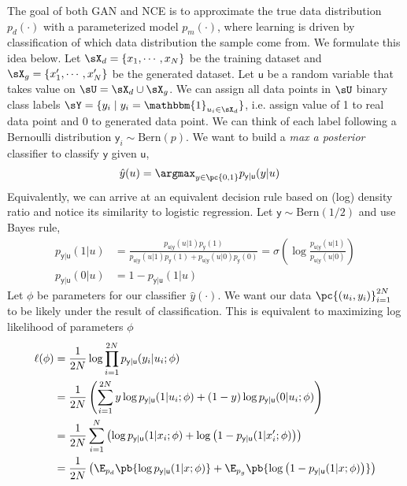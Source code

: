 \documentclass[11pt]{article}
\newcommand\ry{\ensuremath{\mathsf{y}}}
\newcommand\ru{\ensuremath{\mathsf{u}}}
\begin{document}
The goal of both GAN and NCE is to approximate the true data distribution $p_d(\cdot)$ with a parameterized model $p_m(\cdot)$, where learning is driven by classification of which data distribution the sample come from. We formulate this idea below. Let $\sX_d = \{x_1,\cdots,x_N\}$ be the training dataset and $\sX_g = \{x_1',\cdots,x_N'\}$ be the generated dataset. Let $\ru$ be a random variable that takes value on $\sU = \sX_d\cup \sX_g$. We can assign all data points in $\sU$ binary class labels $\sY = \{y_i \mid y_i = \mathbbm{1}_{u_i\in \sX_d} \}$, i.e. assign value of 1 to real data point and 0 to generated data point. We can think of each label following a Bernoulli distribution $\ry_i\sim\text{Bern}(p)$. We want to build a \textit{max a posterior} classifier to classify $\ry$ given $\ru$,
\begin{align*}
    \hat{y}(u) 
        &= \argmax_{y\in\pc{0,1}} p_{\ry|\ru}(y|u)
\end{align*}
Equivalently, we can arrive at an equivalent decision rule based on (log) density ratio and notice its similarity to logistic regression. Let $\ry\sim\text{Bern}(1/2)$ and use Bayes rule,
\begin{align*}
    p_{\ry|\ru}(1|u)
        &= \frac{ p_{\ru|\ry}(u|1)p_{\ry}(1) }{ p_{\ru|\ry}(u|1)p_{\ry}(1) + p_{\ru|\ry}(u|0)p_{\ry}(0) } 
        = \sigma\left(
            \log \frac{ p_{\ru|\ry}(u|1) }{ p_{\ru|\ry}(u|0) }
        \right) \\
    p_{\ry|\ru}(0|u)
        &= 1 - p_{\ry|\ru}(1|u)
\end{align*}
Let $\phi$ be parameters for our classifier $\hat{y}(\cdot)$. We want our data $\pc{(u_i,y_i)}_{i=1}^{2N}$ to be likely under the result of classification. This is equivalent to maximizing log likelihood of parameters $\phi$
\begin{align}
    \label{eq:1}
    \ell(\phi)
        &= \frac{1}{2N} \log \prod_{i=1}^{2N} p_{\ry|\ru}(y_i|u_i;\phi) \notag \\
        &= \frac{1}{2N} \left( \sum_{i=1}^{2N} y\log p_{\ry|\ru}(1|u_i;\phi) + (1-y) \log p_{\ry|\ru}(0|u_i;\phi) \right) \notag\\
        &= \frac{1}{2N} \sum_{i=1}^{N} \left(  \log p_{\ry|\ru}(1|x_i;\phi) + \log \left( 1- p_{\ry|\ru}(1|x_i';\phi) \right)  \right) \notag\\
        &= \frac{1}{2N} \left( \E_{p_d}\pb{ \log p_{\ry|\ru}(1|x;\phi) } +  \E_{p_g}\pb{ \log \left( 1- p_{\ry|\ru}(1|x;\phi) \right) } \right)
\end{align}
\end{document}
